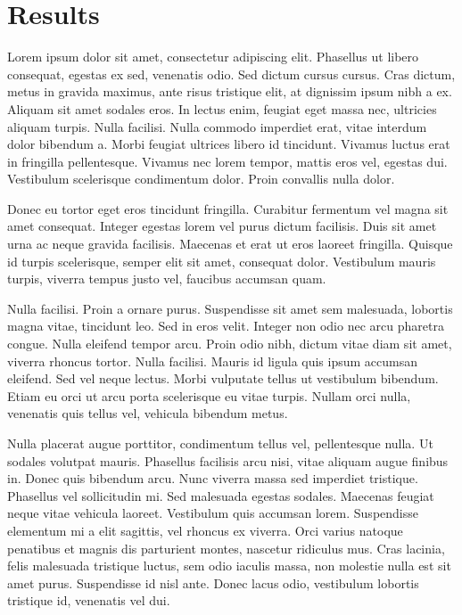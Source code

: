 \section{Results}

Lorem ipsum dolor sit amet, consectetur adipiscing elit. Phasellus ut libero consequat, egestas ex sed, venenatis odio. Sed dictum cursus cursus. Cras dictum, metus in gravida maximus, ante risus tristique elit, at dignissim ipsum nibh a ex. Aliquam sit amet sodales eros. In lectus enim, feugiat eget massa nec, ultricies aliquam turpis. Nulla facilisi. Nulla commodo imperdiet erat, vitae interdum dolor bibendum a. Morbi feugiat ultrices libero id tincidunt. Vivamus luctus erat in fringilla pellentesque. Vivamus nec lorem tempor, mattis eros vel, egestas dui. Vestibulum scelerisque condimentum dolor. Proin convallis nulla dolor.

Donec eu tortor eget eros tincidunt fringilla. Curabitur fermentum vel magna sit amet consequat. Integer egestas lorem vel purus dictum facilisis. Duis sit amet urna ac neque gravida facilisis. Maecenas et erat ut eros laoreet fringilla. Quisque id turpis scelerisque, semper elit sit amet, consequat dolor. Vestibulum mauris turpis, viverra tempus justo vel, faucibus accumsan quam.

Nulla facilisi. Proin a ornare purus. Suspendisse sit amet sem malesuada, lobortis magna vitae, tincidunt leo. Sed in eros velit. Integer non odio nec arcu pharetra congue. Nulla eleifend tempor arcu. Proin odio nibh, dictum vitae diam sit amet, viverra rhoncus tortor. Nulla facilisi. Mauris id ligula quis ipsum accumsan eleifend. Sed vel neque lectus. Morbi vulputate tellus ut vestibulum bibendum. Etiam eu orci ut arcu porta scelerisque eu vitae turpis. Nullam orci nulla, venenatis quis tellus vel, vehicula bibendum metus.

Nulla placerat augue porttitor, condimentum tellus vel, pellentesque nulla. Ut sodales volutpat mauris. Phasellus facilisis arcu nisi, vitae aliquam augue finibus in. Donec quis bibendum arcu. Nunc viverra massa sed imperdiet tristique. Phasellus vel sollicitudin mi. Sed malesuada egestas sodales. Maecenas feugiat neque vitae vehicula laoreet. Vestibulum quis accumsan lorem. Suspendisse elementum mi a elit sagittis, vel rhoncus ex viverra. Orci varius natoque penatibus et magnis dis parturient montes, nascetur ridiculus mus. Cras lacinia, felis malesuada tristique luctus, sem odio iaculis massa, non molestie nulla est sit amet purus. Suspendisse id nisl ante. Donec lacus odio, vestibulum lobortis tristique id, venenatis vel dui.

